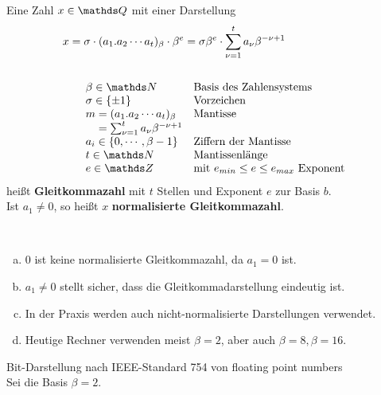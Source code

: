 \begin{Defe}
  \label{3.1.1} 
  Eine Zahl $x\in\Q$ mit einer Darstellung
  \begin{align*}
    x&=\sigma \cdot(a_1 . a_2 \cdots a_t)_{\beta}\cdot \beta^e 
       = \sigma\beta^e \cdot \sum_{\nu=1}^{t}a_\nu \beta^{-\nu+1}\\\\
     &\quad\begin{array}{ll}
             \beta\in\N & \text{Basis des Zahlensystems}\index{Basis}\\
             \sigma \in\{\pm 1\} &\text{Vorzeichen} \\
             m = (a_1 . a_2 \cdots a_t)_{\beta} &\text{Mantisse}\index{Mantisse}\\
             \phantom{m}= \sum_{\nu=1}^{t}a_\nu \beta^{-\nu+1} \\
             a_i \in\{0,\cdots , \beta-1\}&\text{Ziffern der Mantisse}\\
             t\in\N&\text{Mantissenlänge} \\
             e\in\Z &\text{mit }e_{min}\leq e \leq e_{max} \text{ Exponent}
           \end{array}
  \end{align*}
  heißt \textbf{Gleitkommazahl} mit $t$ Stellen und Exponent $e$ zur Basis $b$. \\
  Ist $a_1\neq 0$, so heißt $x$ \textbf{normalisierte Gleitkommazahl}.
\end{Defe}

\begin{Beme}
  \label{3.1.2}~
  \begin{enumerate}[a)]
  \item 0 ist keine normalisierte Gleitkommazahl, da $a_1 =  0$ ist.
  \item $a_1\neq 0$ stellt sicher, dass die Gleitkommadarstellung eindeutig ist.
  \item In der Praxis werden auch nicht-normalisierte Darstellungen verwendet.
  \item Heutige Rechner verwenden meist $\beta =2$, aber auch $\beta=8, \beta=16$.
  \end{enumerate}
\end{Beme}

\label{3.1.3}
Bit-Darstellung nach IEEE-Standard 754 von floating point numbers \\
Sei die Basis $\beta=2$.

